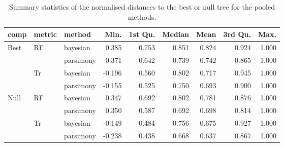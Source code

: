 \begin{table}[ht]
\centering
\begin{tabular}{lllrrrrrr}
  \hline
comp & metric & method & Min. & 1st Qu. & Median & Mean & 3rd Qu. & Max. \\ 
  \hline
Best & RF & bayesian & 0.385 & 0.753 & 0.851 & 0.824 & 0.924 & 1.000 \\ 
   &  & parsimony & 0.371 & 0.642 & 0.739 & 0.742 & 0.865 & 1.000 \\ 
   & Tr & bayesian & -0.196 & 0.560 & 0.802 & 0.717 & 0.945 & 1.000 \\ 
   &  & parsimony & -0.155 & 0.525 & 0.750 & 0.693 & 0.900 & 1.000 \\ 
  Null & RF & bayesian & 0.347 & 0.692 & 0.802 & 0.781 & 0.876 & 1.000 \\ 
   &  & parsimony & 0.350 & 0.587 & 0.692 & 0.698 & 0.814 & 1.000 \\ 
   & Tr & bayesian & -0.149 & 0.484 & 0.756 & 0.675 & 0.927 & 1.000 \\ 
   &  & parsimony & -0.238 & 0.438 & 0.668 & 0.637 & 0.867 & 1.000 \\ 
   \hline
\end{tabular}
\caption{Summary statistics of the normalised distances to the best or null tree for the pooled methods.} 
\label{Full_Tab_pooledmethod}
\end{table}
